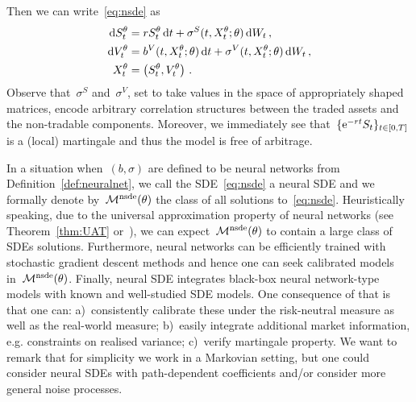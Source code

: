Then we can write~\eqref{eq:nsde} as
\begin{equation}\label{eq:nsde2}
\begin{split}
\mathrm{d} S^{\theta}_t & = r S_t^{\theta} \,\mathrm{d} t + \sigma^S(t,X_t^\theta;\theta )\,\mathrm{d} W_t\,,\\
\mathrm{d} V^\theta_t & = b^V(t,X_t^{\theta}; \theta) \,\mathrm{d} t + \sigma^V(t,X_t^\theta;\theta )\,\mathrm{d} W_t\,,\\
X^\theta_t & = \left(S^\theta_t, V^\theta_t\right)	\,.
\end{split}
\end{equation}
Observe that~$\sigma^S$ and~$\sigma^V$, set to take values in the space of appropriately shaped matrices, encode arbitrary correlation structures between the traded assets and the non-tradable components.
Moreover, we immediately see that~$\{\mathrm{e}^{-rt}S_t\}_{t\in[0, T]}$ is a (local) martingale and thus the model is free of arbitrage. 

In a situation when~$(b,\sigma)$ are defined to be neural networks from Definition~\ref{def:neuralnet}, we call the SDE~\eqref{eq:nsde} a neural SDE and we formally denote by~$\mathcal{M}^{\text{nsde}}(\theta)$ the class of all solutions to~\eqref{eq:nsde}. 
Heuristically speaking, due to the universal approximation property of neural networks (see Theorem~\ref{thm:UAT} or~\cite{Hornik1991ApproximationNetworks, Sontag1997CompleteNetworks, Cuchiero2020DeepODEs}), we can expect~$\mathcal{M}^{\text{nsde}}(\theta)$ to contain a large class of SDEs solutions.
Furthermore, neural networks can be efficiently trained with stochastic gradient descent methods and hence one can seek calibrated models in~$\mathcal{M}^{\text{nsde}}(\theta)$. 
Finally, neural SDE integrates black-box neural network-type models with known and well-studied SDE models. 
One consequence of that is that one can: a)~consistently calibrate these under the risk-neutral measure as well as the real-world measure; b)~easily integrate additional market information, e.g. constraints on realised variance; c)~verify martingale property. We want to remark that for simplicity we work in a Markovian setting, but one could consider neural SDEs with path-dependent coefficients and/or consider more general noise processes.

